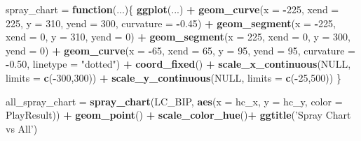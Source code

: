 \documentclass[]{article}
\newenvironment{Shaded}{\begin{snugshade}}{\end{snugshade}}
\newcommand{\KeywordTok}[1]{\textcolor[rgb]{0.13,0.29,0.53}{\textbf{#1}}}
\newcommand{\DataTypeTok}[1]{\textcolor[rgb]{0.13,0.29,0.53}{#1}}
\newcommand{\DecValTok}[1]{\textcolor[rgb]{0.00,0.00,0.81}{#1}}
\newcommand{\FloatTok}[1]{\textcolor[rgb]{0.00,0.00,0.81}{#1}}
\newcommand{\StringTok}[1]{\textcolor[rgb]{0.31,0.60,0.02}{#1}}
\newcommand{\OtherTok}[1]{\textcolor[rgb]{0.56,0.35,0.01}{#1}}
\newcommand{\ControlFlowTok}[1]{\textcolor[rgb]{0.13,0.29,0.53}{\textbf{#1}}}
\newcommand{\OperatorTok}[1]{\textcolor[rgb]{0.81,0.36,0.00}{\textbf{#1}}}
\newcommand{\NormalTok}[1]{#1}
\begin{document}
\begin{Shaded}
\begin{Highlighting}[]
\NormalTok{spray_chart =}\StringTok{ }\ControlFlowTok{function}\NormalTok{(...)\{}
  \KeywordTok{ggplot}\NormalTok{(...) }\OperatorTok{+}\StringTok{ }
\StringTok{    }\KeywordTok{geom_curve}\NormalTok{(}\DataTypeTok{x =} \OperatorTok{-}\DecValTok{225}\NormalTok{, }\DataTypeTok{xend =} \DecValTok{225}\NormalTok{, }\DataTypeTok{y =} \DecValTok{310}\NormalTok{, }\DataTypeTok{yend =} \DecValTok{300}\NormalTok{, }\DataTypeTok{curvature =} \OperatorTok{-}\FloatTok{0.45}\NormalTok{) }\OperatorTok{+}\StringTok{ }
\StringTok{    }\KeywordTok{geom_segment}\NormalTok{(}\DataTypeTok{x =} \OperatorTok{-}\DecValTok{225}\NormalTok{, }\DataTypeTok{xend =} \DecValTok{0}\NormalTok{, }\DataTypeTok{y =} \DecValTok{310}\NormalTok{, }\DataTypeTok{yend =} \DecValTok{0}\NormalTok{) }\OperatorTok{+}
\StringTok{    }\KeywordTok{geom_segment}\NormalTok{(}\DataTypeTok{x =}  \DecValTok{225}\NormalTok{, }\DataTypeTok{xend =} \DecValTok{0}\NormalTok{, }\DataTypeTok{y =} \DecValTok{300}\NormalTok{, }\DataTypeTok{yend =} \DecValTok{0}\NormalTok{) }\OperatorTok{+}\StringTok{ }
\StringTok{    }\KeywordTok{geom_curve}\NormalTok{(}\DataTypeTok{x =} \OperatorTok{-}\DecValTok{65}\NormalTok{, }\DataTypeTok{xend =} \DecValTok{65}\NormalTok{, }\DataTypeTok{y =} \DecValTok{95}\NormalTok{, }\DataTypeTok{yend =} \DecValTok{95}\NormalTok{, }\DataTypeTok{curvature =} \OperatorTok{-}\FloatTok{0.50}\NormalTok{, }\DataTypeTok{linetype =} \StringTok{"dotted"}\NormalTok{) }\OperatorTok{+}
\StringTok{    }\KeywordTok{coord_fixed}\NormalTok{() }\OperatorTok{+}
\StringTok{    }\KeywordTok{scale_x_continuous}\NormalTok{(}\OtherTok{NULL}\NormalTok{, }\DataTypeTok{limits =} \KeywordTok{c}\NormalTok{(}\OperatorTok{-}\DecValTok{300}\NormalTok{,}\DecValTok{300}\NormalTok{)) }\OperatorTok{+}\StringTok{ }
\StringTok{    }\KeywordTok{scale_y_continuous}\NormalTok{(}\OtherTok{NULL}\NormalTok{, }\DataTypeTok{limits =} \KeywordTok{c}\NormalTok{(}\OperatorTok{-}\DecValTok{25}\NormalTok{,}\DecValTok{500}\NormalTok{))}
\NormalTok{\}}

\NormalTok{all_spray_chart =}\StringTok{ }\KeywordTok{spray_chart}\NormalTok{(LC_BIP, }\KeywordTok{aes}\NormalTok{(}\DataTypeTok{x =}\NormalTok{ hc_x, }\DataTypeTok{y =}\NormalTok{ hc_y, }\DataTypeTok{color =}\NormalTok{ PlayResult)) }\OperatorTok{+}
\StringTok{  }\KeywordTok{geom_point}\NormalTok{() }\OperatorTok{+}
\StringTok{  }\KeywordTok{scale_color_hue}\NormalTok{()}\OperatorTok{+}
\StringTok{  }\KeywordTok{ggtitle}\NormalTok{(}\StringTok{'Spray Chart vs All'}\NormalTok{)}



\end{Highlighting}
\end{Shaded}
\end{document}
